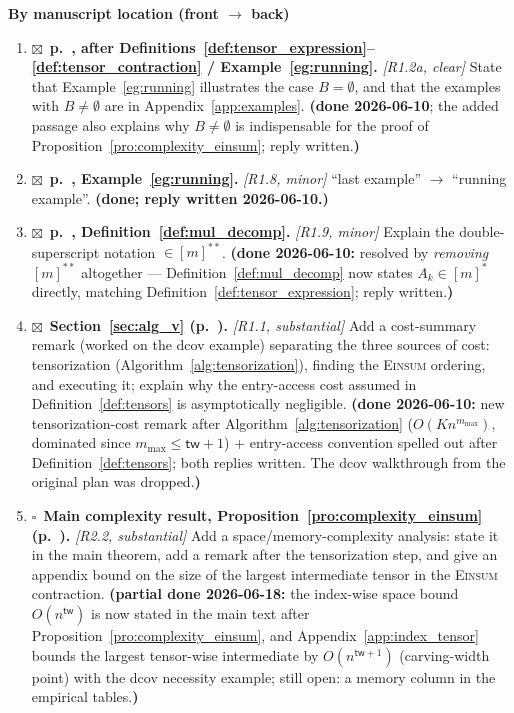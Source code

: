 \documentclass[11pt]{article}
\newcommand{\bx}{$\square$\ }   %
\newcommand{\at}[1]{\textbf{#1}} %
\begin{document}
\noindent\textbf{\large By manuscript location (front $\to$ back)}
\begin{enumerate}[label=\arabic*., leftmargin=*, itemsep=0.45em]

\item $\boxtimes$\ \at{p.~\pageref{def:tensor_expression}, after Definitions~\ref{def:tensor_expression}--\ref{def:tensor_contraction} / Example~\ref{eg:running}.}
\emph{[R1.2a, clear]} State that Example~\ref{eg:running} illustrates the case
$B=\emptyset$, and that the examples with $B\neq\emptyset$ are in
Appendix~\ref{app:examples}.
\textbf{(done 2026-06-10}; the added passage also explains why $B \neq
\emptyset$ is indispensable for the proof of
Proposition~\ref{pro:complexity_einsum}; reply written.\textbf{)}

\item $\boxtimes$\ \at{p.~\pageref{eg:running}, Example~\ref{eg:running}.}
\emph{[R1.8, minor]} ``last example'' $\to$ ``running example''.
\textbf{(done; reply written 2026-06-10.)}

\item $\boxtimes$\ \at{p.~\pageref{def:mul_decomp}, Definition~\ref{def:mul_decomp}.}
\emph{[R1.9, minor]} Explain the double-superscript notation $\in[m]^{**}$.
\textbf{(done 2026-06-10:} resolved by \emph{removing} $[m]^{**}$ altogether ---
Definition~\ref{def:mul_decomp} now states $A_k \in [m]^{*}$ directly, matching
Definition~\ref{def:tensor_expression}; reply written.\textbf{)}

\item $\boxtimes$\ \at{Section~\ref{sec:alg_v} (p.~\pageref{sec:alg_v}).}
\emph{[R1.1, substantial]} Add a cost-summary remark (worked on the dcov example)
separating the three sources of cost: tensorization (Algorithm~\ref{alg:tensorization}),
finding the \textsc{Einsum} ordering, and executing it; explain why the entry-access
cost assumed in Definition~\ref{def:tensors} is asymptotically negligible.
\textbf{(done 2026-06-10:} new tensorization-cost remark after
Algorithm~\ref{alg:tensorization} ($O(K n^{m_{\max}})$, dominated since
$m_{\max} \le \mathsf{tw}+1$) + entry-access convention spelled out after
Definition~\ref{def:tensors}; both replies written. The dcov walkthrough from
the original plan was dropped.\textbf{)}

\item \bx \at{Main complexity result, Proposition~\ref{pro:complexity_einsum} (p.~\pageref{pro:complexity_einsum}).}
\emph{[R2.2, substantial]} Add a space/memory-complexity analysis: state it in the
main theorem, add a remark after the tensorization step, and give an appendix bound
on the size of the largest intermediate tensor in the \textsc{Einsum} contraction.
\textbf{(partial done 2026-06-18:} the index-wise space bound $O(n^{\mathsf{tw}})$
is now stated in the main text after Proposition~\ref{pro:complexity_einsum}, and
Appendix~\ref{app:index_tensor} bounds the largest tensor-wise intermediate by
$O(n^{\mathsf{tw}+1})$ (carving-width point) with the dcov necessity example;
still open: a memory column in the empirical tables.\textbf{)}


\end{enumerate}
\end{document}
